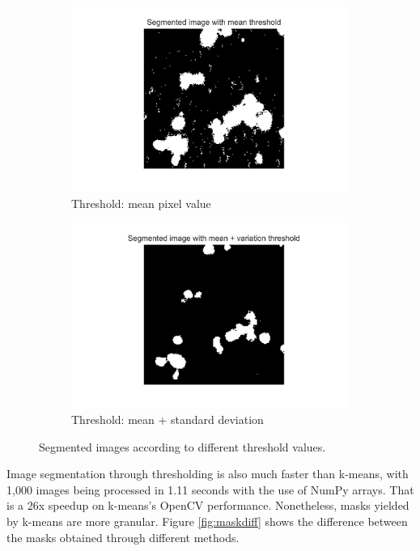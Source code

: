 \begin{figure}[h]
    \centering
    \begin{subfigure}[h!]{0.4\textwidth}
        \includegraphics[width=\textwidth]{dissertation/figures/mean_threshold_cell.jpg}
        \caption{Threshold: mean pixel value}
        \label{fig:thresholdmean}
    \end{subfigure}
    \begin{subfigure}[h!]{0.4\textwidth}
        \includegraphics[width=\textwidth]{dissertation/figures/mean_std_threshold_cell.jpg}
        \caption{Threshold: mean + standard deviation}
        \label{fig:thresholdstd}
    \end{subfigure}
    \caption{Segmented images according to different threshold values.}
\end{figure}

Image segmentation through thresholding is also much faster than k-means, with 1,000 images being processed in 1.11 seconds with the use of NumPy arrays. That is a 26x speedup on k-means's OpenCV performance. Nonetheless, masks yielded by k-means are more granular. Figure \ref{fig:maskdiff} shows the difference between the masks obtained through different methods.

